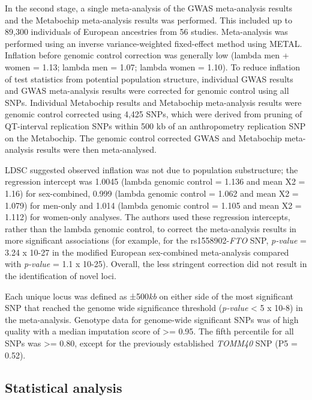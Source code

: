 \documentclass[11pt,twoside]{bristolthesis}
\begin{document}
In the second stage, a single meta-analysis of the GWAS meta-analysis results and the Metabochip meta-analysis results was performed. This included up to 89,300 individuals of European ancestries from 56 studies. Meta-analysis was performed using an inverse variance-weighted fixed-effect method using METAL. Inflation before genomic control correction was generally low (lambda men + women = 1.13; lambda men = 1.07; lambda women = 1.10). To reduce inflation of test statistics from potential population structure, individual GWAS results and GWAS meta-analysis results were corrected for genomic control using all SNPs. Individual Metabochip results and Metabochip meta-analysis results were genomic control corrected using 4,425 SNPs, which were derived from pruning of QT-interval replication SNPs within 500 kb of an anthropometry replication SNP on the Metabochip. The genomic control corrected GWAS and Metabochip meta-analysis results were then meta-analysed.

LDSC suggested observed inflation was not due to population substructure; the regression intercept was 1.0045 (lambda genomic control = 1.136 and mean X2 = 1.16) for sex-combined, 0.999 (lambda genomic control = 1.062 and mean X2 = 1.079) for men-only and 1.014 (lambda genomic control = 1.105 and mean X2 = 1.112) for women-only analyses. The authors used these regression intercepts, rather than the lambda genomic control, to correct the meta-analysis results in more significant associations (for example, for the rs1558902-\emph{FTO} SNP, \emph{p-value} = 3.24 x 10-27 in the modified European sex-combined meta-analysis compared with \emph{p-value} = 1.1 x 10-25). Overall, the less stringent correction did not result in the identification of novel loci.

Each unique locus was defined as ±500\emph{kb} on either side of the most significant SNP that reached the genome wide significance threshold (\emph{p-value} \textless{} 5 x 10-8) in the meta-analysis. Genotype data for genome-wide significant SNPs was of high quality with a median imputation score of \textgreater{}= 0.95. The fifth percentile for all SNPs was \textgreater{}= 0.80, except for the previously established \emph{TOMM40} SNP (P5 = 0.52).

\hypertarget{statistical-analysis}{%
\subsection{Statistical analysis}\label{statistical-analysis}}
\end{document}
